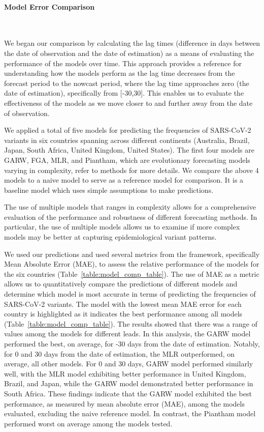 \documentclass[11pt,oneside,letterpaper]{article}
\begin{document}
\paragraph{Model Error Comparison}\

We began our comparison by calculating the lag times (difference in days between the date of observation and the date of estimation) as a means of evaluating the performance of the models over time.
This approach provides a reference for understanding how the models perform as the lag time decreases from the forecast period to the nowcast period, where the lag time approaches zero (the date of estimation), specifically from [-30,30].
This enables us to evaluate the effectiveness of the models as we move closer to and further away from the date of observation.

We applied a total of five models for predicting the frequencies of SARS-CoV-2 variants in six countries spanning across different continents (Australia, Brazil, Japan, South Africa, United Kingdom, United States).
The first four models are GARW, FGA, MLR, and Piantham, which are evolutionary forecasting models varying in complexity, refer to methods for more details. 
We compare the above 4 models to a naive model to serve as a reference model for comparison.
It is a baseline model which uses simple assumptions to make predictions. %

The use of multiple models that ranges in complexity allows for a comprehensive evaluation of the performance and robustness of different forecasting methods.
In particular, the use of multiple models allows us to examine if more complex models may be better at capturing epidemiological variant patterns. 

We used our predictions and used several metrics from the framework, specifically Mean Absolute Error (MAE), to assess the relative performance of the models for the six countries (Table~\ref{table:model_comp_table}).
The use of MAE as a metric allows us to quantitatively compare the predictions of different models and determine which model is most accurate in terms of predicting the frequencies of SARS-CoV-2 variants.
The model with the lowest mean MAE error for each country is highlighted as it indicates the best performance among all models (Table~\ref{table:model_comp_table}). 
The results showed that there was a range of values among the models for different leads.
In this analysis, the GARW model performed the best, on average, for -30 days from the date of estimation.
Notably, for 0 and 30 days from the date of estimation, the MLR outperformed, on average, all other models. 
For 0 and 30 days, GARW model performed similarly well, with the MLR model exhibiting better performance in United Kingdom, Brazil, and Japan, while the GARW model demonstrated better performance in South Africa. 
These findings indicate that the GARW model exhibited the best performance, as measured by mean absolute error (MAE), among the models evaluated, excluding the naive reference model.
In contrast, the Piantham model performed worst on average among the models tested.
\end{document}
